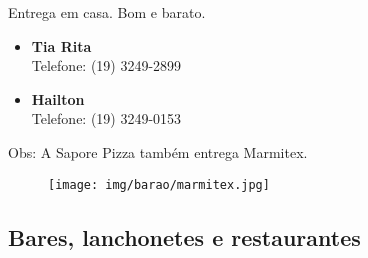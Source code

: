 Entrega em casa. Bom e barato.

\begin{itemize}
    \item   \textbf{Tia Rita}
        \\Telefone: (19) 3249-2899

    \item   \textbf{Hailton}
        \\Telefone: (19) 3249-0153
\end{itemize}

Obs: A Sapore Pizza também entrega Marmitex.

\begin{figure}[h!]
    \centering
    \texttt{[image: img/barao/marmitex.jpg]}
\end{figure}

\subsection{Bares, lanchonetes e restaurantes}

